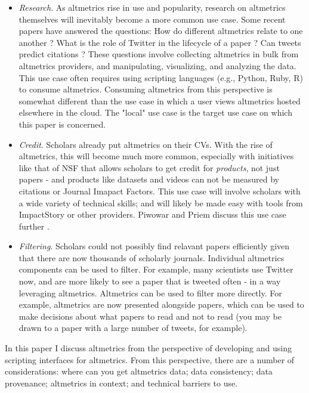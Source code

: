 \documentclass[letterpaper,superscriptaddress,showkeys,longbibliography]{revtex4-1}\usepackage{graphicx, color}
\begin{document}
\begin{itemize}
  \item \emph{Research}. As altmetrics rise in use and popularity, research on altmetrics themselves will inevitably become a more common use case. Some recent papers have answered the questions: How do different altmetrics relate to one another \cite{yan2011,bollen2009}? What is the role of Twitter in the lifecycle of a paper \cite{darling2013}? Can tweets predict citations \cite{eysenbach2011}? These questions involve collecting altmetrics in bulk from altmetrics providers, and manipulating, visualizing, and analyzing the data. This use case often requires using scripting languages (e.g., Python, Ruby, R) to consume altmetrics. Consuming altmetrics from this perspective is somewhat different than the use case in which a user views altmetrics hosted elsewhere in the cloud. The "local" use case is the target use case on which this paper is concerned. 
  \item \emph{Credit}. Scholars already put altmetrics on their CVs. With the rise of altmetrics, this will become much more common, especially with initiatives like that of NSF that allows scholars to get credit for \emph{products}, not just papers - and products like datasets and videos can not be measured by citations or Journal Imapact Factors. This use case will involve scholars with a wide variety of technical skills; and will likely be made easy with tools from ImpactStory or other providers. Piwowar and Priem discuss this use case further \cite{piwowar2013power}. 
  \item \emph{Filtering}. Scholars could not possibly find relavant papers efficiently given that there are now thousands of scholarly journals. Individual altmetrics components can be used to filter. For example, many scientists use Twitter now, and are more likely to see a paper that is tweeted often - in a way leveraging altmetrics. Altmetrics can be used to filter more directly. For example, altmetrics are now presented alongside papers, which can be used to make decisions about what papers to read and not to read (you may be drawn to a paper with a large number of tweets, for example).
\end{itemize}


In this paper I discuss altmetrics from the perspective of developing and using scripting interfaces for altmetrics. From this perspective, there are a number of considerations: where can you get altmetrics data; data consistency; data provenance; altmetrics in context; and technical barriers to use.
\end{document}
